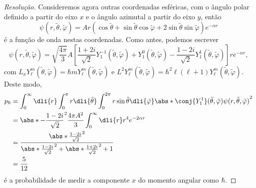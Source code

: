 \begin{proof}[Resolução]
    Consideremos agora outras coordenadas esféricas, com o ângulo polar definido a partir do eixo \(x\) e o ângulo azimutal a partir do eixo \(y\), então
    \begin{equation*}
        \psi(r, \tilde{\theta}, \tilde{\varphi}) = Ar \left(\cos\tilde\theta + \sin\tilde\theta \cos\tilde\varphi + 2 \sin\tilde\theta \sin\tilde\varphi\right) e^{-\alpha r}
    \end{equation*}
    é a função de onda nestas coordenadas. Como antes, podemos escrever
    \begin{equation*}
        \psi(r, \tilde{\theta}, \tilde{\varphi}) = \sqrt{\frac{4\pi}{3}}A \left[\frac{1+2i}{\sqrt{2}}Y_{1}^{-1}(\tilde\theta,\tilde\varphi) + Y_{1}^0(\tilde\theta,\tilde\varphi) - \frac{1 - 2i}{\sqrt{2}}Y_{1}^{1}(\tilde\theta,\tilde\varphi)\right] r e^{-\alpha r},
    \end{equation*}
    com \(L_x Y_{\ell}^{m}(\tilde{\theta}, \tilde{\varphi}) = \hbar m Y_{\ell}^m(\tilde{\theta}, \tilde{\varphi})\) e \(L^2 Y_{\ell}^m(\tilde{\theta}, \tilde{\varphi}) = \hbar^2\ell(\ell + 1)Y_{\ell}^m(\tilde{\theta}, \tilde{\varphi})\). Deste modo,
    \begin{align*}
        p_\hbar &= \int_0^\infty \dli{r} \int_0^\pi r\dli{\tilde\theta}\int_0^{2\pi}r\sin\tilde\theta \dli{\tilde\varphi} \abs*{\conj{Y_{1}^{1}}(\tilde\theta,\tilde\varphi)\psi(r,\tilde\theta,\tilde\varphi)}^2\\
                &= \abs*{-\frac{1 - 2i}{\sqrt{2}}}^2 \frac{4\pi A^2}{3} \int_0^\infty \dli{r} r^4 e^{-2 \alpha r}\\
                &= \frac{\abs*{\frac{1 - 2i}{\sqrt{2}}}^2}{\abs*{\frac{1 - 2i}{\sqrt{2}}}^2 + \abs*{\frac{1+ 2i}{\sqrt{2}}}^2 + 1}\\
                &= \frac{5}{12}
    \end{align*}
    é a probabilidade de medir a componente \(x\) do momento angular como \(\hbar\).
\end{proof}
